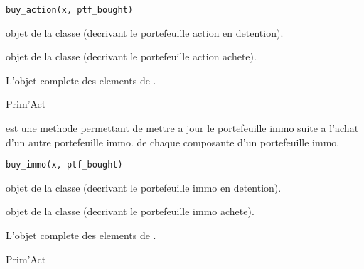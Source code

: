 \documentclass[a4paper]{book}
\begin{document}
%
\begin{Usage}
\begin{verbatim}
buy_action(x, ptf_bought)
\end{verbatim}
\end{Usage}
%
\begin{Arguments}
\begin{ldescription}
\item[\code{x}] objet de la classe  (decrivant le portefeuille action en detention).

\item[\code{ptf\_bought}] objet de la classe  (decrivant le portefeuille action achete).
\end{ldescription}
\end{Arguments}
%
\begin{Value}
L'objet  complete des elements de .
\end{Value}
%
\begin{Author}\relax
Prim'Act
\end{Author}
%
\begin{Description}\relax
{} est une methode permettant de mettre a jour le portefeuille immo suite a l'achat d'un autre portefeuille immo.
de chaque composante d'un portefeuille immo.
\end{Description}
%
\begin{Usage}
\begin{verbatim}
buy_immo(x, ptf_bought)
\end{verbatim}
\end{Usage}
%
\begin{Arguments}
\begin{ldescription}
\item[\code{x}] objet de la classe  (decrivant le portefeuille immo en detention).

\item[\code{ptf\_bought}] objet de la classe  (decrivant le portefeuille immo achete).
\end{ldescription}
\end{Arguments}
%
\begin{Value}
L'objet  complete des elements de .
\end{Value}
%
\begin{Author}\relax
Prim'Act
\end{Author}
\end{document}
